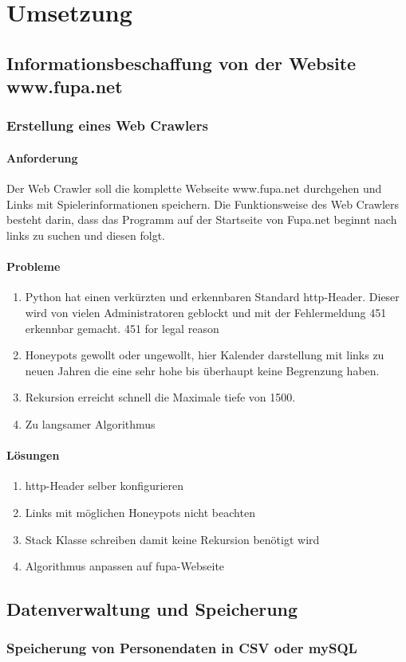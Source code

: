 
\chapter{Umsetzung}  %
\label{cha:} %
\section{Informationsbeschaffung von der Website www.fupa.net} %
\label{sec:} %


\subsection{Erstellung eines Web Crawlers} %
\label{sse:}
\subsubsection{Anforderung}
Der Web Crawler soll die komplette Webseite www.fupa.net durchgehen und Links mit Spielerinformationen speichern.
Die Funktionsweise des Web Crawlers besteht darin, dass das Programm auf der Startseite von Fupa.net beginnt nach links zu suchen und diesen folgt.
\subsubsection{Probleme} %
\begin{enumerate}
	\item Python hat einen verkürzten und erkennbaren Standard http-Header. Dieser wird von vielen Administratoren geblockt und mit der Fehlermeldung 451 erkennbar gemacht. 451 for legal reason
	\item Honeypots gewollt oder ungewollt, hier Kalender darstellung mit links zu neuen Jahren die eine sehr hohe bis überhaupt keine Begrenzung haben.
	\item Rekursion erreicht schnell die Maximale tiefe von 1500.
	\item Zu langsamer Algorithmus
\end{enumerate}


\subsubsection{Lösungen}
\begin{enumerate}
	\item http-Header selber konfigurieren
	\item Links mit möglichen Honeypots nicht beachten
	\item Stack Klasse schreiben damit keine Rekursion benötigt wird
	\item Algorithmus anpassen auf fupa-Webseite
\end{enumerate}

\section{Datenverwaltung und Speicherung}
\subsection{Speicherung von Personendaten in CSV oder mySQL}


